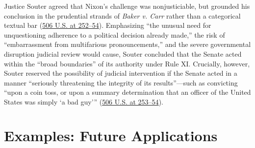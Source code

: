 \documentclass[12pt]{article}
\begin{document}
Justice Souter agreed that Nixon's challenge was nonjusticiable, but grounded his conclusion in the prudential strands of \textit{Baker v. Carr} rather than a categorical textual bar (\href{https://supreme.justia.com/cases/federal/us/506/224/}{506 U.S. at 252--54}). Emphasizing ``the unusual need for unquestioning adherence to a political decision already made,'' the risk of ``embarrassment from multifarious pronouncements,'' and the severe governmental disruption judicial review would cause, Souter concluded that the Senate acted within the ``broad boundaries'' of its authority under Rule XI. Crucially, however, Souter reserved the possibility of judicial intervention if the Senate acted in a manner ``seriously threatening the integrity of its results''---such as convicting ``upon a coin toss, or upon a summary determination that an officer of the United States was simply `a bad guy'{}'' (\href{https://supreme.justia.com/cases/federal/us/506/224/}{506 U.S. at 253--54}).

\section{Examples: Future Applications}
\end{document}
